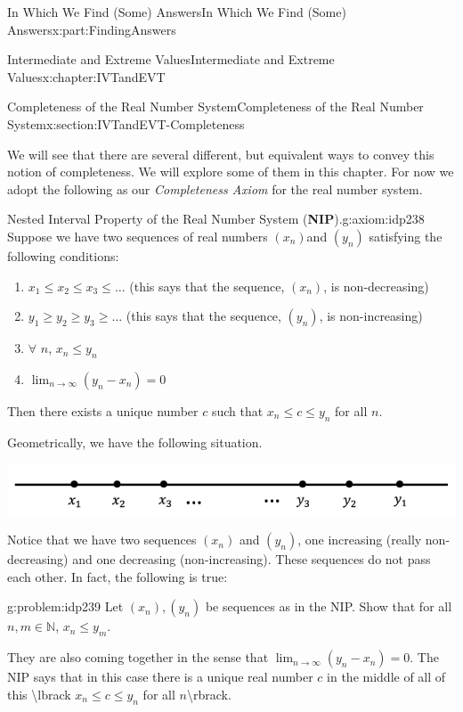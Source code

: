 \documentclass[oneside,10pt,]{book}
\newcommand{\terminology}[1]{\textbf{#1}}
\numberwithin{equation}{section}
\newcommand{\NN}{\mathbb {N}}
\begin{document}
\begin{partptx}{In Which We Find (Some) Answers}{}{In Which We Find (Some) Answers}{}{}{x:part:FindingAnswers}
\begin{chapterptx}{Intermediate and Extreme Values}{}{Intermediate and Extreme Values}{}{}{x:chapter:IVTandEVT}
\begin{sectionptx}{Completeness of the Real Number System}{}{Completeness of the Real Number System}{}{}{x:section:IVTandEVT-Completeness}
\par
We will see that there are several different, but equivalent ways to convey this notion of completeness. We will explore some of them in this chapter. For now we adopt the following as our \emph{Completeness Axiom} for the real number system.%
\begin{axiom}{Nested Interval Property of the Real Number System (\terminology{NIP}).}{}{g:axiom:idp238}%
Suppose we have two sequences of real numbers \(\left(x_n\right)\)and \(\left(y_n\right)\) satisfying the following conditions:%
\par
%
\begin{enumerate}
\item{}\(x_1\leq x_2\leq x_3\leq\ldots\) (this says that the sequence, \(\left(x_n\right)\), is non-decreasing)%
\item{}\(y_1\geq y_2\geq y_3\geq\ldots\) (this says that the sequence, \(\left(y_n\right)\), is non-increasing) %
\item{}\(\forall\) \(n\), \(x_n\leq y_n\)%
\item{}\(\displaystyle \lim_{n\rightarrow\infty}\left(y_n-x_n\right)=0\)%
\end{enumerate}
%
\par
Then there exists a unique number \(c\) such that \(x_n\leq
c\leq y_n\) for all \(n\).%
\end{axiom}
Geometrically, we have the following situation.%
\begin{image}{0.125}{0.75}{0.125}%
\includegraphics[width=\linewidth]{images/Ch6fig3.png}
\end{image}%
Notice that we have two sequences \(\left(x_n\right)\) and \(\left(y_n\right)\), one increasing (really non-decreasing) and one decreasing (non-increasing). These sequences do not pass each other. In fact, the following is true:%
\begin{problem}{}{g:problem:idp239}%
Let \((x_n), (y_n)\) be sequences as in the NIP. Show that for all \(n, m \in\NN\), \(x_n\le y_m\).%
\end{problem}
They are also coming together in the sense that \(\lim_{n\rightarrow\infty}\left(y_n-x_n\right)=0\).  The NIP says that in this case there is a unique real number \(c\) in the middle of all of this \textbackslash{}lbrack \(x_n\leq c\leq y_n\) for all \(n\)\textbackslash{}rbrack.%

\end{sectionptx}
\end{chapterptx}
\end{partptx}
\end{document}
